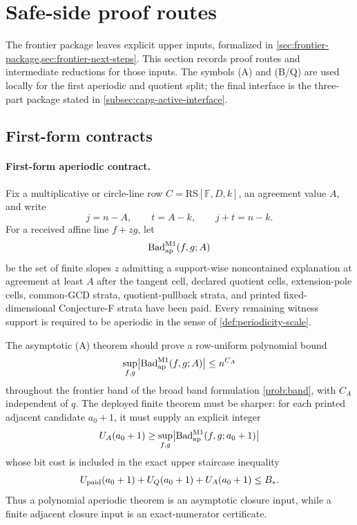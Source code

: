\documentclass[11pt]{article}
\theoremstyle{definition}
\theoremstyle{remark}
\newcommand{\F}{\mathbb{F}}
\newcommand{\B}{B}
\newcommand{\RS}{\mathrm{RS}}
\newcommand{\Syn}{\operatorname{Syn}}
\begin{document}
\providecommand{\B}{\mathbb B}
\providecommand{\F}{\mathbb F}
\providecommand{\RS}{\mathrm{RS}}
\providecommand{\Dloc}{\mathcal D}
\providecommand{\PP}{\mathbb P}
\providecommand{\Bad}{\operatorname{Bad}}
\providecommand{\Syn}{\operatorname{Syn}}

\section{Safe-side proof routes}\label{sec:capfaq-strategies}

The frontier package leaves explicit upper inputs, formalized in \cref{sec:frontier-package,sec:frontier-next-steps}.  This section records proof routes and intermediate reductions for those inputs.  The symbols \textup{(A)} and \textup{(B/Q)} are used locally for the first aperiodic and quotient split; the final interface is the three-part package stated in \cref{subsec:capg-active-interface}.

\subsection{First-form contracts}\label{subsec:capfaq-contracts}

\paragraph{First-form aperiodic contract.}
Fix a multiplicative or circle-line row $C=\RS[\F,D,k]$, an agreement value $A$, and write
\[
        j=n-A,
        \qquad t=A-k,
        \qquad j+t=n-k .
\]
For a received affine line $f+zg$, let
\[
        \Bad_{\rm ap}^{\rm M1}(f,g;A)
\]
be the set of finite slopes $z$ admitting a support-wise noncontained explanation at agreement at least $A$ after the tangent cell, declared quotient cells, extension-pole cells, common-GCD strata, quotient-pullback strata, and printed fixed-dimensional Conjecture-F strata have been paid.  Every remaining witness support is required to be aperiodic in the sense of \cref{def:periodicity-scale}.

The asymptotic \textup{(A)} theorem should prove a row-uniform polynomial bound
\[
        \sup_{f,g}\bigl|\Bad_{\rm ap}^{\rm M1}(f,g;A)\bigr|
        \le n^{C_A}
\]
throughout the frontier band of the broad band formulation \cref{prob:band}, with $C_A$ independent of $q$.  The deployed finite theorem must be sharper: for each printed adjacent candidate $a_0+1$, it must supply an explicit integer
\[
        U_A(a_0+1)
        \ge
        \sup_{f,g}\bigl|\Bad_{\rm ap}^{\rm M1}(f,g;a_0+1)\bigr|
\]
whose bit cost is included in the exact upper staircase inequality
\[
        U_{\rm paid}(a_0+1)+U_Q(a_0+1)+U_A(a_0+1)\le B_* .
\]
Thus a polynomial aperiodic theorem is an asymptotic closure input, while a finite adjacent closure input is an exact-numerator certificate.
\end{document}
